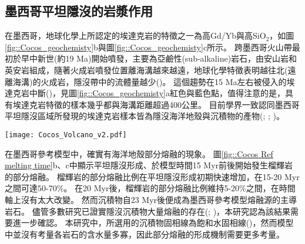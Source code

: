\subsection{墨西哥平坦隱沒的岩漿作用}
在墨西哥，地球化學上所認定的埃達克岩的特徵之一為高Gd/Yb與高SiO$_2$，如圖\ref{fig::Cocos_geochemisty}b與圖\ref{fig::Cocos_geochemisty}c所示。
跨墨西哥火山帶最初於早中新世(約19 Ma)開始噴發，主要為亞鹼性(sub-alkaline)岩石，由安山岩和英安岩組成，隨著火成岩噴發位置離海溝越來越遠，地球化學特徵表明越往北(遠離海溝)的火成岩，隱沒帶中的流體量越少(\citealp{ferrari2012dynamic})。
這個趨勢在15 Ma左右被侵入的埃達克岩中斷(\citealp{mori2007effects})，見圖\ref{fig::Cocos_geochemisty}a紅色與藍色點，值得注意的是，具有埃達克岩特徵的樣本幾乎都與海溝距離超過400公里。
目前學界一致認同墨西哥平坦隱沒區域所發現的埃達克岩樣本皆為隱沒海洋地殼與沉積物的產物(\citealp{Gutscher2000Bcan}; \citealp{ferrari2012dynamic}; \citealp{Manea2017})。

\begin{figure*}[ht!]
    \centering
    \texttt{[image: Cocos\_Volcano\_v2.pdf]}
    \caption[墨西哥區域火山島弧地球化學分析，摘自\citet{ferrari2012dynamic}]{墨西哥區域火山島弧地球化學分析，摘自\citet{ferrari2012dynamic}。白點為距現今火山弧前緣小於150公里的樣本，藍色點為具現今火山弧前緣大於150公里且位在西經99-101$^{\circ}$的樣本，紅色點為具現今火山弧前緣小於150公里且位在西經96.4-99$^{\circ}$的樣本。(a)火成岩樣本年紀與現今海溝距離作圖。(b)火成岩樣本中的SiO$_2$含量與現今海溝距離作圖。(c)火成岩樣本中Gd/Yb比值與現今海溝距離作圖。(d)墨西哥中新世火山位置圖。細虛線表示到海溝的距離，粗虛線是\ref{平坦隱沒中的埃達克岩}圖例中使用的邊界。 CC: Cerro Colorado dome，CG: Cerro Grande volcan塞羅格蘭德火山， LJ: La Joya volcan拉霍亞火山， PH: Palo Huérfano 火山， PS: Palma Sola帕爾馬索拉，SA: Sierra de Angangueo塞拉利昂德安甘格奧， SM: San Martín聖馬丁， SMC: Sierra de Mil Cumbres， T-M: Tenancingo–Malinalco特南寧哥-馬利納爾科， Za: Zamorano volcano薩莫拉諾火山， Zi: Zimapán area Zimapán 地區。
    }
    \label{fig::Cocos_geochemisty}
\end{figure*}

在墨西哥參考模型中，確實有海洋地殼部分熔融的現象。
圖\ref{fig::Cocos Ref melting time}b、c中顯示平坦隱沒形成、於模型時間15 Myr前後開始發生榴輝岩的部分熔融。
榴輝岩的部分熔融比例在平坦隱沒形成初期快速增加，在15-20 Myr之間可達50-70$\%$。
在20 Myr後，榴輝岩的部分熔融比例維持5-20$\%$之間，在時間軸上沒有太大改變。
然而沉積物自23 Myr後便成為墨西哥參考模型熔融源的主導岩石。
儘管多數研究已證實隱沒沉積物大量熔融的存在(\citealp{van2011subduction}; \citealp{Forster2021})，本研究認為該結果需要進一步確認。
本研究中，所選用的沉積物固相線為飽和水固相線(\citealp{van2011subduction})，然而模型中並沒有考量各岩石的含水量多寡，因此部分熔融的形成機制需要更多考量。

